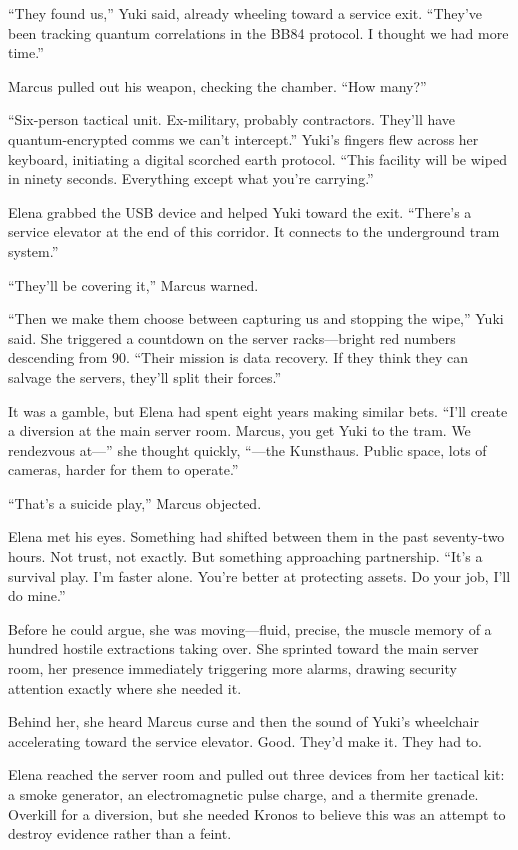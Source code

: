 ``They found us,'' Yuki said, already wheeling toward a service exit. ``They've been tracking quantum correlations in the BB84 protocol. I thought we had more time.''

Marcus pulled out his weapon, checking the chamber. ``How many?''

``Six-person tactical unit. Ex-military, probably contractors. They'll have quantum-encrypted comms we can't intercept.'' Yuki's fingers flew across her keyboard, initiating a digital scorched earth protocol. ``This facility will be wiped in ninety seconds. Everything except what you're carrying.''

Elena grabbed the USB device and helped Yuki toward the exit. ``There's a service elevator at the end of this corridor. It connects to the underground tram system.''

``They'll be covering it,'' Marcus warned.

``Then we make them choose between capturing us and stopping the wipe,'' Yuki said. She triggered a countdown on the server racks---bright red numbers descending from 90. ``Their mission is data recovery. If they think they can salvage the servers, they'll split their forces.''

It was a gamble, but Elena had spent eight years making similar bets. ``I'll create a diversion at the main server room. Marcus, you get Yuki to the tram. We rendezvous at---'' she thought quickly, ``---the Kunsthaus. Public space, lots of cameras, harder for them to operate.''

``That's a suicide play,'' Marcus objected.

Elena met his eyes. Something had shifted between them in the past seventy-two hours. Not trust, not exactly. But something approaching partnership. ``It's a survival play. I'm faster alone. You're better at protecting assets. Do your job, I'll do mine.''

Before he could argue, she was moving---fluid, precise, the muscle memory of a hundred hostile extractions taking over. She sprinted toward the main server room, her presence immediately triggering more alarms, drawing security attention exactly where she needed it.

Behind her, she heard Marcus curse and then the sound of Yuki's wheelchair accelerating toward the service elevator. Good. They'd make it. They had to.

Elena reached the server room and pulled out three devices from her tactical kit: a smoke generator, an electromagnetic pulse charge, and a thermite grenade. Overkill for a diversion, but she needed Kronos to believe this was an attempt to destroy evidence rather than a feint.

